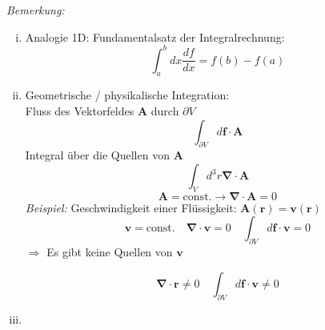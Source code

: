 \documentclass[titlepage,11pt,a4paper,ngerman]{report}
\newcommand{\tx}[1]{\textrm{#1}}
\newcommand{\const}{\tx{const.}}
\renewcommand{\vec}[1]{\boldsymbol{#1}}
\begin{document}

\noindent
\emph{Bemerkung:}\\
\begin{enumerate}[i)]
	\item Analogie 1D: Fundamentalsatz der Integralrechnung:
	\begin{equation*}
	\int_{a}^{b} dx \frac{df}{dx} = f(b) - f(a)
	\end{equation*}
	\item Geometrische / physikalische Integration:\\
	Fluss des Vektorfeldes $ \vec{A} $ durch $ \partial V $
	\begin{equation*}
	\int_{\partial V} d\vec{f} \cdot \vec{A}
	\end{equation*}
	Integral über die Quellen von $ \vec{A} $
	\begin{equation*}
	\int_V d^3r \vec{\nabla} \cdot \vec{A}
	\end{equation*}
	\begin{equation*}
	\vec{A} = \const \rightarrow \vec{\nabla} \cdot \vec{A} = 0
	\end{equation*}
	\emph{Beispiel:} Geschwindigkeit einer Flüssigkeit: $ \vec{A}(\vec{r}) = \vec{v}(\vec{r}) $\\
	
	
	$$ \vec{v} = \const \quad \vec{\nabla} \cdot \vec{v} = 0 \quad \int_{\partial V} d\vec{f} \cdot \vec{v} = 0 $$
	$ \Rightarrow $ Es gibt keine Quellen von $ \vec{v} $
	
	
	$$ \vec{\nabla} \cdot \vec{r} \neq 0 \quad \int_{\partial V} d\vec{f} \cdot \vec{v} \neq 0 $$
	\item
	
	

\end{enumerate}
\end{document}
